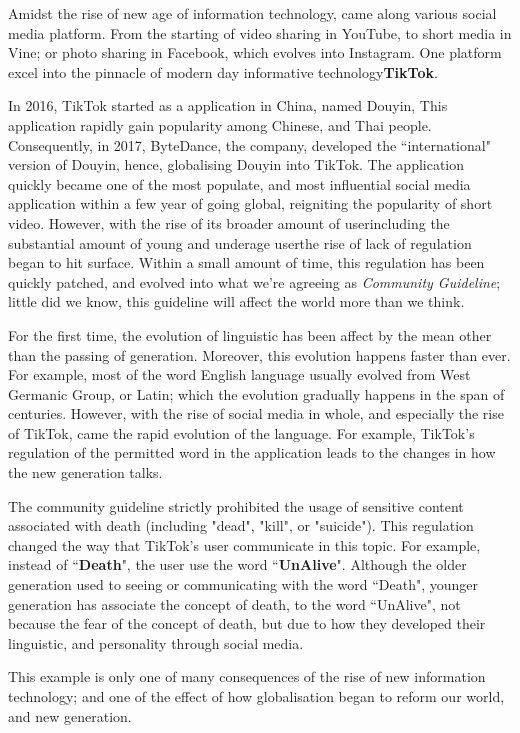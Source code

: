 \documentclass[11pt]{article}
\begin{document}
Amidst the rise of new age of information technology, came along various social media platform. From the starting of video sharing in YouTube, to short media in Vine; or photo sharing in Facebook, which evolves into Instagram. One platform excel into the pinnacle of modern day informative technology\textemdash \textbf{TikTok}. 

In 2016, TikTok started as a application in China, named Douyin, This application rapidly gain popularity among Chinese, and Thai people. Consequently, in 2017, ByteDance, the company, developed the ``international" version of Douyin, hence, globalising Douyin into TikTok. The application quickly became one of the most populate, and most influential social media application within a few year of going global, re\textendash igniting  the popularity of short video. However, with the rise of its broader amount of user\textemdash including the substantial amount of young and underage user\textemdash the rise of lack of regulation began to hit surface. Within a small amount of time, this regulation has been quickly patched, and evolved into what we're agreeing as \textit{Community Guideline}; little did we know, this guideline will affect the world more than we think.

For the first time, the evolution of linguistic has been affect by the mean other than the passing of generation. Moreover, this evolution happens faster than ever. For example, most of the word English language usually evolved from West Germanic Group, or Latin; which the evolution gradually happens in the span of centuries. However, with the rise of social media in whole, and especially the rise of TikTok, came the rapid evolution of the language. For example, TikTok's regulation of the permitted word in the application leads to the changes in how the new generation talks.

The community guideline strictly prohibited the usage of sensitive content associated with death (including "dead", "kill", or "suicide"). This regulation changed the way that TikTok's user communicate in this topic. For example, instead of ``\textbf{Death}", the user use the word ``\textbf{Un\textendash Alive}". Although the older generation used to seeing or communicating with the word ``Death", younger generation has associate the concept of death, to the word ``Un\textendash Alive", not because the fear of the concept of death, but due to how they developed their linguistic, and personality through social media.

This example is only one of many consequences of the rise of new information technology; and one of the effect of how globalisation began to reform our world, and new generation.
\end{document}
